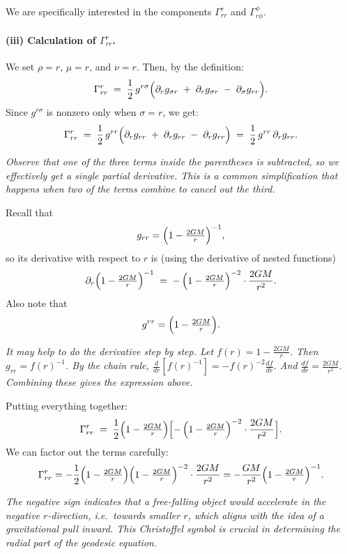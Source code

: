 \noindent
We are specifically interested in the components \(\Gamma^r_{rr}\) and \(\Gamma^\phi_{r\phi}\).

\paragraph{(iii) Calculation of \(\Gamma^r_{rr}\).}
We set \(\rho = r\), \(\mu = r\), and \(\nu = r\). Then, by the definition:
\[
\Gamma^r_{rr}
\;=\;
\frac{1}{2}\,g^{r\sigma}
\Bigl(
\partial_r g_{\sigma r}
\;+\;
\partial_r g_{\sigma r}
\;-\;
\partial_\sigma g_{rr}
\Bigr).
\]
Since \(g^{r\sigma}\) is nonzero only when \(\sigma = r\), we get:
\[
\Gamma^r_{rr}
\;=\;
\frac{1}{2}\, g^{rr}
\Bigl(
\partial_r g_{rr}
\;+\;
\partial_r g_{rr}
\;-\;
\partial_r g_{rr}
\Bigr)
\;=\;
\frac{1}{2}\, g^{rr} \,\partial_r g_{rr}.
\]

\emph{Observe that one of the three terms inside the parentheses is subtracted, so we effectively get a single partial derivative. This is a common simplification that happens when two of the terms combine to cancel out the third.}

\smallskip

\noindent
Recall that
\[
g_{rr} 
= 
\Bigl(1 - \tfrac{2GM}{r}\Bigr)^{-1},
\]
so its derivative with respect to \(r\) is (using the derivative of nested functions)
\[
\partial_r \Bigl(1 - \tfrac{2GM}{r}\Bigr)^{-1}
\;=\;
-\,\Bigl(1 - \tfrac{2GM}{r}\Bigr)^{-2}
\cdot
\frac{2GM}{r^2}.
\]
Also note that
\[
g^{rr} 
= 
\Bigl(1 - \tfrac{2GM}{r}\Bigr).
\]

\emph{It may help to do the derivative step by step. Let \(f(r) = 1 - \tfrac{2GM}{r}\). Then \(g_{rr} = f(r)^{-1}\). By the chain rule, \(\tfrac{d}{dr}[f(r)^{-1}] = -f(r)^{-2} \tfrac{df}{dr}\). And \(\tfrac{df}{dr} = \tfrac{2GM}{r^2}\). Combining these gives the expression above.}

\smallskip

\noindent
Putting everything together:
\[
\Gamma^r_{rr}
\;=\;
\frac{1}{2}
\Bigl(1 - \tfrac{2GM}{r}\Bigr)
\Bigl[
-\,\Bigl(1 - \tfrac{2GM}{r}\Bigr)^{-2}
\cdot 
\frac{2GM}{r^2}
\Bigr].
\]
We can factor out the terms carefully:
\[
\Gamma^r_{rr}
=
-\frac{1}{2} 
\Bigl(1 - \tfrac{2GM}{r}\Bigr) 
\Bigl(1 - \tfrac{2GM}{r}\Bigr)^{-2}
\cdot
\frac{2GM}{r^2}
=
-\frac{GM}{r^2} 
\Bigl(1 - \tfrac{2GM}{r}\Bigr)^{-1}.
\]

\emph{The negative sign indicates that a free-falling object would accelerate in the negative \(r\)-direction, i.e.\ towards smaller \(r\), which aligns with the idea of a gravitational pull inward. This Christoffel symbol is crucial in determining the radial part of the geodesic equation.}

